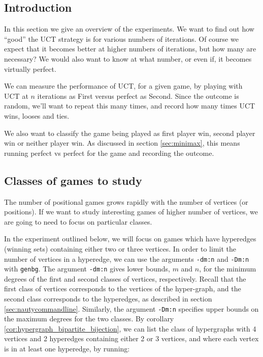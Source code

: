 \subsection{Introduction}

In this section we give an overview of the experiments.
We want to find out how ``good'' the UCT strategy is for various numbers of iterations.
Of course we expect that it becomes better at higher numbers of iterations, but how many are necessary?
We would also want to know at what number, or even if, it becomes virtually perfect.

We can measure the performance of UCT, for a given game, by playing with UCT at $n$ iterations as First versus perfect as Second.
Since the outcome is random, we'll want to repeat this many times, and record how many times UCT wins, looses and ties.

We also want to classify the game being played as first player win, second player win or neither player win.
As discussed in section \ref{sec:minimax}, this means running perfect vs perfect for the game and recording the outcome.


\subsection{Classes of games to study}

The number of positional games grows rapidly with the number of vertices (or positions).
If we want to study interesting games of higher number of vertices, we are going to need to focus on particular classes.

In the experiment outlined below, we will focus on games which have hyperedges (winning sets) containing either two or three vertices.
In order to limit the number of vertices in a hyperedge, we can use the arguments \texttt{-dm:n} and \texttt{-Dm:n} with \texttt{genbg}.
The argument \texttt{-dm:n} gives lower bounds, $m$ and $n$, for the minimum degrees of the first and second classes of vertices, respectively.
Recall that the first class of vertices corresponds to the vertices of the hyper-graph, and the second class corresponds to the hyperedges, as described in section \ref{sec:nautycommandline}.
Similarly, the argument \texttt{-Dm:n} specifies upper bounds on the maximum degrees for the two classes.
By corollary \ref{cor:hypergraph_bipartite_bijection}, we can list the class of hypergraphs with 4 vertices and 2 hyperedges containing either 2 or 3 vertices, and where each vertex is in at least one hyperedge, by running:

